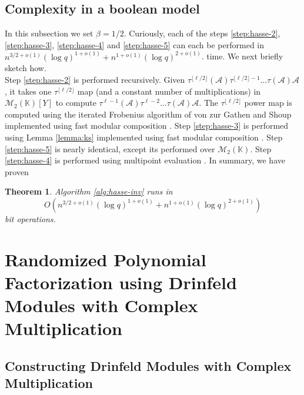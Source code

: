 \documentclass[12pt]{article}
\theoremstyle{plain}
\newtheorem{theorem}{Theorem}
\theoremstyle{definition}
\def\K{\ensuremath{\mathbb{K}}}
\begin{document}
\subsection{Complexity in a boolean model}

In this subsection we set $\beta = 1/2$. Curiously, each of the steps \ref{step:hasse-2}, 
\ref{step:hasse-3}, \ref{step:hasse-4} and \ref{step:hasse-5} can each be performed in 
$n^{3/2+o(1)} (\log q)^{1+o(1)} + n^{1+o(1)} (\log q)^{2+o(1)}$. time. We next briefly sketch 
how.\\ 

Step \ref{step:hasse-2} is performed recursively. Given 
$\tau^{\lfloor\ell/2\rfloor}(\mathcal{A})\tau^{\lfloor\ell/2\rfloor-1}\ldots\tau(\mathcal{A}) 
\mathcal{A}$, it takes one $\tau^{\lfloor\ell/2\rfloor}$ map (and a constant number of 
multiplications) in $\mathscr{M}_2(\K)[Y]$ to compute $\tau^{\ell-1}(\mathcal{A}) \tau^{\ell-2} 
\ldots \tau(\mathcal{A}) \mathcal{A}$. The $\tau^{\lfloor\ell/2\rfloor}$ power map is computed 
using the iterated Frobenius algorithm of von zur Gathen and Shoup \cite{gs} implemented using fast 
modular composition \cite{ku}. Step \ref{step:hasse-3} is performed using Lemma \ref{lemma:ks} 
implemented using fast modular composition \cite{ku}. Step \ref{step:hasse-5} is nearly identical, 
except its performed over $\mathscr{M}_2(\K)$. Step \ref{step:hasse-4} is performed using 
multipoint evaluation \cite{vzGG}. In summary, we have proven 
\begin{theorem}
	\label{theo:hasse-inv}
	Algorithm \ref{alg:hasse-inv} runs in 
	\[O(n^{3/2+o(1)} (\log q)^{1+o(1)} + n^{1+o(1)} (\log q)^{2+o(1)})\]
	bit operations.
\end{theorem}



 
 

\section{Randomized Polynomial Factorization using Drinfeld Modules with Complex Multiplication}
\subsection{Constructing Drinfeld Modules with Complex 
Multiplication}\label{drinfeld_construction_subsection}
\end{document}

